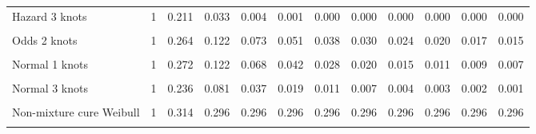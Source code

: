 \documentclass[
]{article}
\begin{document}
\begin{table}[H]
{\begin{tabular}[t]{lrrrrrrrrrrr}
Hazard 3 knots & 1 & 0.211 & 0.033 & 0.004 & 0.001 & 0.000 & 0.000 & 0.000 & 0.000 & 0.000 & 0.000\\
\cellcolor{gray!10}{Odds 1 knots} & \cellcolor{gray!10}{1} & \cellcolor{gray!10}{0.285} & \cellcolor{gray!10}{0.145} & \cellcolor{gray!10}{0.093} & \cellcolor{gray!10}{0.067} & \cellcolor{gray!10}{0.052} & \cellcolor{gray!10}{0.042} & \cellcolor{gray!10}{0.035} & \cellcolor{gray!10}{0.030} & \cellcolor{gray!10}{0.026} & \cellcolor{gray!10}{0.023}\\
Odds 2 knots & 1 & 0.264 & 0.122 & 0.073 & 0.051 & 0.038 & 0.030 & 0.024 & 0.020 & 0.017 & 0.015\\
\cellcolor{gray!10}{Odds 3 knots} & \cellcolor{gray!10}{1} & \cellcolor{gray!10}{0.238} & \cellcolor{gray!10}{0.094} & \cellcolor{gray!10}{0.051} & \cellcolor{gray!10}{0.033} & \cellcolor{gray!10}{0.023} & \cellcolor{gray!10}{0.018} & \cellcolor{gray!10}{0.014} & \cellcolor{gray!10}{0.011} & \cellcolor{gray!10}{0.009} & \cellcolor{gray!10}{0.008}\\
Normal 1 knots & 1 & 0.272 & 0.122 & 0.068 & 0.042 & 0.028 & 0.020 & 0.015 & 0.011 & 0.009 & 0.007\\
\cellcolor{gray!10}{Normal 2 knots} & \cellcolor{gray!10}{1} & \cellcolor{gray!10}{0.270} & \cellcolor{gray!10}{0.119} & \cellcolor{gray!10}{0.065} & \cellcolor{gray!10}{0.040} & \cellcolor{gray!10}{0.027} & \cellcolor{gray!10}{0.019} & \cellcolor{gray!10}{0.014} & \cellcolor{gray!10}{0.010} & \cellcolor{gray!10}{0.008} & \cellcolor{gray!10}{0.006}\\
Normal 3 knots & 1 & 0.236 & 0.081 & 0.037 & 0.019 & 0.011 & 0.007 & 0.004 & 0.003 & 0.002 & 0.001\\
\cellcolor{gray!10}{Mixture cure Weibull} & \cellcolor{gray!10}{1} & \cellcolor{gray!10}{0.319} & \cellcolor{gray!10}{0.309} & \cellcolor{gray!10}{0.309} & \cellcolor{gray!10}{0.309} & \cellcolor{gray!10}{0.309} & \cellcolor{gray!10}{0.309} & \cellcolor{gray!10}{0.309} & \cellcolor{gray!10}{0.309} & \cellcolor{gray!10}{0.309} & \cellcolor{gray!10}{0.309}\\
Non-mixture cure Weibull & 1 & 0.314 & 0.296 & 0.296 & 0.296 & 0.296 & 0.296 & 0.296 & 0.296 & 0.296 & 0.296\\
\cellcolor{gray!10}{Mixture cure Log-normal} & \cellcolor{gray!10}{1} & \cellcolor{gray!10}{0.295} & \cellcolor{gray!10}{0.215} & \cellcolor{gray!10}{0.200} & \cellcolor{gray!10}{0.196} & \cellcolor{gray!10}{0.194} & \cellcolor{gray!10}{0.193} & \cellcolor{gray!10}{0.193} & \cellcolor{gray!10}{0.193} & \cellcolor{gray!10}{0.193} & \cellcolor{gray!10}{0.193}\\

\end{tabular}}
\end{table}
\end{document}
